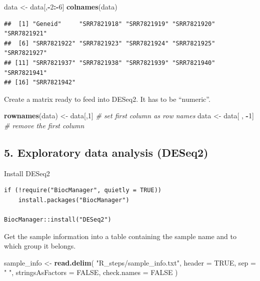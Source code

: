 \documentclass[
]{article}
\newenvironment{Shaded}{\begin{snugshade}}{\end{snugshade}}
\newcommand{\AttributeTok}[1]{\textcolor[rgb]{0.13,0.29,0.53}{#1}}
\newcommand{\CommentTok}[1]{\textcolor[rgb]{0.56,0.35,0.01}{\textit{#1}}}
\newcommand{\ConstantTok}[1]{\textcolor[rgb]{0.56,0.35,0.01}{#1}}
\newcommand{\DecValTok}[1]{\textcolor[rgb]{0.00,0.00,0.81}{#1}}
\newcommand{\FunctionTok}[1]{\textcolor[rgb]{0.13,0.29,0.53}{\textbf{#1}}}
\newcommand{\NormalTok}[1]{#1}
\newcommand{\OtherTok}[1]{\textcolor[rgb]{0.56,0.35,0.01}{#1}}
\newcommand{\SpecialCharTok}[1]{\textcolor[rgb]{0.81,0.36,0.00}{\textbf{#1}}}
\newcommand{\StringTok}[1]{\textcolor[rgb]{0.31,0.60,0.02}{#1}}
\begin{document}
\begin{Shaded}
\begin{Highlighting}[]
\NormalTok{data }\OtherTok{\textless{}{-}}\NormalTok{ data[,}\SpecialCharTok{{-}}\DecValTok{2}\SpecialCharTok{:{-}}\DecValTok{6}\NormalTok{]}
\FunctionTok{colnames}\NormalTok{(data)}
\end{Highlighting}
\end{Shaded}

\begin{verbatim}
##  [1] "Geneid"     "SRR7821918" "SRR7821919" "SRR7821920" "SRR7821921"
##  [6] "SRR7821922" "SRR7821923" "SRR7821924" "SRR7821925" "SRR7821927"
## [11] "SRR7821937" "SRR7821938" "SRR7821939" "SRR7821940" "SRR7821941"
## [16] "SRR7821942"
\end{verbatim}

Create a matrix ready to feed into DESeq2. It has to be ``numeric''.

\begin{Shaded}
\begin{Highlighting}[]
\FunctionTok{rownames}\NormalTok{(data) }\OtherTok{\textless{}{-}}\NormalTok{ data[,}\DecValTok{1}\NormalTok{]   }\CommentTok{\# set first column as row names}
\NormalTok{data }\OtherTok{\textless{}{-}}\NormalTok{ data[ , }\SpecialCharTok{{-}}\DecValTok{1}\NormalTok{]          }\CommentTok{\# remove the first column}
\end{Highlighting}
\end{Shaded}

\subsection{5. Exploratory data analysis
(DESeq2)}\label{exploratory-data-analysis-deseq2}

Install DESeq2

\begin{verbatim}
if (!require("BiocManager", quietly = TRUE))
    install.packages("BiocManager")

BiocManager::install("DESeq2")
\end{verbatim}

Get the sample information into a table containing the sample name and
to which group it belongs.

\begin{Shaded}
\begin{Highlighting}[]
\NormalTok{sample\_info }\OtherTok{\textless{}{-}} \FunctionTok{read.delim}\NormalTok{(}
  \StringTok{"R\_steps/sample\_info.txt"}\NormalTok{,}
  \AttributeTok{header =} \ConstantTok{TRUE}\NormalTok{,}
  \AttributeTok{sep =} \StringTok{" "}\NormalTok{,}
  \AttributeTok{stringsAsFactors =} \ConstantTok{FALSE}\NormalTok{,}
  \AttributeTok{check.names =} \ConstantTok{FALSE}
\NormalTok{)}
\end{Highlighting}
\end{Shaded}
\end{document}
